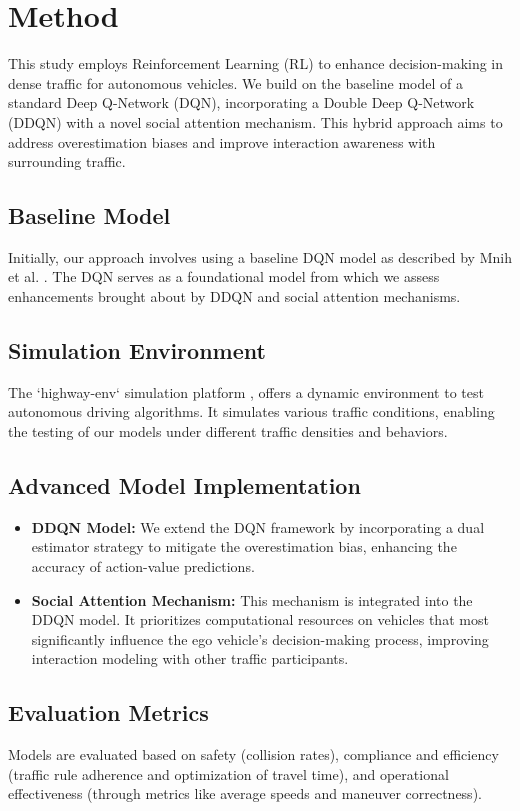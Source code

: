 \documentclass{article}
\begin{document}
\section{Method}

This study employs Reinforcement Learning (RL) to enhance decision-making in dense traffic for autonomous vehicles. We build on the baseline model of a standard Deep Q-Network (DQN), incorporating a Double Deep Q-Network (DDQN) with a novel social attention mechanism. This hybrid approach aims to address overestimation biases and improve interaction awareness with surrounding traffic.

\subsection{Baseline Model}
Initially, our approach involves using a baseline DQN model as described by Mnih et al. \cite{mnih2015humanlevel}. The DQN serves as a foundational model from which we assess enhancements brought about by DDQN and social attention mechanisms.

\subsection{Simulation Environment}
The `highway-env` simulation platform \cite{highway-env}, offers a dynamic environment to test autonomous driving algorithms. It simulates various traffic conditions, enabling the testing of our models under different traffic densities and behaviors.

\subsection{Advanced Model Implementation}
\begin{itemize}
    \item \textbf{DDQN Model:} We extend the DQN framework by incorporating a dual estimator strategy to mitigate the overestimation bias, enhancing the accuracy of action-value predictions.
    \item \textbf{Social Attention Mechanism:} This mechanism is integrated into the DDQN model. It prioritizes computational resources on vehicles that most significantly influence the ego vehicle’s decision-making process, improving interaction modeling with other traffic participants.
\end{itemize}

\subsection{Evaluation Metrics}
Models are evaluated based on safety (collision rates), compliance and efficiency (traffic rule adherence and optimization of travel time), and operational effectiveness (through metrics like average speeds and maneuver correctness).
\end{document}

